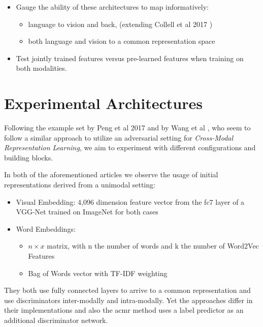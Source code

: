 \documentclass[12pt]{article}
\begin{document}
\begin{itemize}
    \item Gauge the ability of these architectures to map informatively:
      \begin{itemize}
        \item language to vision and back, (extending Collell et al 2017 \cite{collell})
          \item both language and vision to a common representation space
      \end{itemize}

    \item
      Test jointly trained features versus pre-learned features when training on both modalities.
\end{itemize}

\section{Experimental Architectures}


Following the example set by Peng et al 2017 \cite{DBLP:journals/corr/abs-1710-05106} and by Wang et al \cite{acmr}, who seem to follow a similar approach to utilize an adversarial setting \cite{2014arXiv1406.2661G} for \textit{Cross-Modal Representation Learning}, we aim to experiment with different configurations and building blocks.

In both of the aforementioned articles we observe the usage of initial representations derived from a unimodal setting:

\begin{itemize}
  \item{Visual Embedding:} 4,096 dimension feature vector from the fc7 layer of a VGG-Net trained on ImageNet for both cases
  \item{Word Embeddings:} 
    \begin{itemize}
      \item $n \times x$ matrix, with n the number of words and k the number of Word2Vec Features \cite{DBLP:journals/corr/MikolovSCCD13}
      \item Bag of Words vector with TF-IDF weighting

    \end{itemize}
\end{itemize}

They both use fully connected layers to arrive to a common representation and use discriminators inter-modally and intra-modally. Yet the approaches differ in their implementations and also the acmr method uses a label predictor as an additional discriminator network.
\end{document}
